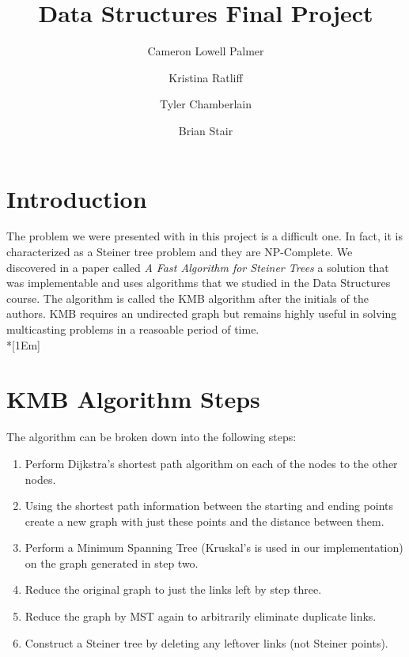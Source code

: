 \documentclass[titlepage,twoside,openright,12pt]{article}
\title{Data Structures Final Project}
\author{Cameron Lowell Palmer \and Kristina Ratliff \and Tyler Chamberlain \and Brian Stair}
\begin{document}
\maketitle

\begin{raggedright}

\section*{Introduction}
The problem we were presented with in this project is a difficult one. In fact, it
is characterized as a Steiner tree problem and they are NP-Complete. We discovered
in a paper called \textit{A Fast Algorithm for Steiner Trees}\cite{ks:kmb} a solution that
was implementable and uses algorithms that we studied in the Data Structures course. 
The algorithm is called the KMB algorithm after the initials of the authors. KMB
requires an undirected graph but remains highly useful in solving multicasting 
problems in a reasoable period of time.\\*[1Em]

\section*{KMB Algorithm Steps}
The algorithm can be broken down into the following steps:
\begin{enumerate}
\item Perform Dijkstra's shortest path algorithm on each of the nodes to the other nodes.
\item Using the shortest path information between the starting and ending points create a new graph with just these points and the distance between them.
\item Perform a Minimum Spanning Tree (Kruskal's is used in our implementation) on the graph generated in step two.
\item Reduce the original graph to just the links left by step three.
\item Reduce the graph by MST again to arbitrarily eliminate duplicate links.
\item Construct a Steiner tree by deleting any leftover links (not Steiner points).
\end{enumerate}


\end{raggedright}
\end{document}
